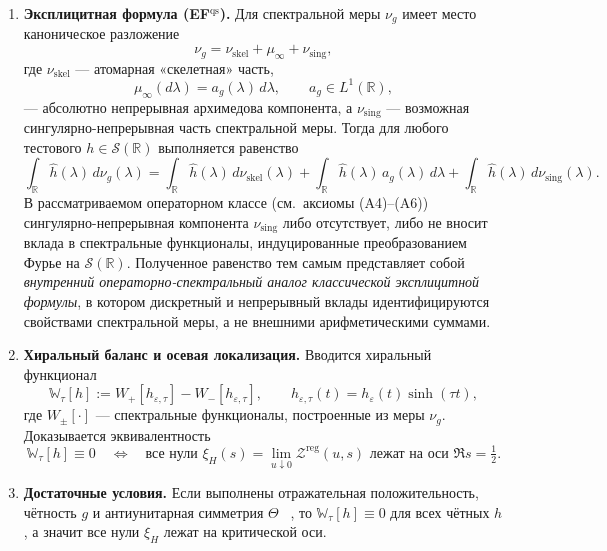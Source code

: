 \documentclass{article}
\numberwithin{equation}{section}
\theoremstyle{plain}
\theoremstyle{definition}
\theoremstyle{remark}
\def\infty{∞}\def\partial{∂}\def\sum{Σ}\def\int{∫}%
\def\cdot{·}\def\times{×}\def\pm{±}\def\mp{∓}\def\approx{≈}%
\begin{document}
\begin{enumerate}
\item[(iv)] \textbf{Эксплицитная формула (EF$^{\mathrm{qs}}$).}
Для спектральной меры $\nu_g$ имеет место каноническое разложение
\begin{equation}
\nu_g=\nu_{\mathrm{skel}}+\mu_\infty+\nu_{\mathrm{sing}},
\end{equation}
где $\nu_{\mathrm{skel}}$ — атомарная «скелетная» часть,
\begin{equation}
\mu_\infty(d\lambda)=a_g(\lambda)\,d\lambda,\qquad a_g\in L^1(\mathbb R),
\end{equation}
— абсолютно непрерывная архимедова компонента,
а $\nu_{\mathrm{sing}}$ — возможная сингулярно-непрерывная часть спектральной меры.
Тогда для любого тестового $h\in\mathcal S(\mathbb R)$ выполняется равенство
\begin{equation}
\int_{\mathbb R}\widehat h(\lambda)\,d\nu_g(\lambda)
=
\int_{\mathbb R}\widehat h(\lambda)\,d\nu_{\mathrm{skel}}(\lambda)
+
\int_{\mathbb R}\widehat h(\lambda)\,a_g(\lambda)\,d\lambda
+
\int_{\mathbb R}\widehat h(\lambda)\,d\nu_{\mathrm{sing}}(\lambda).
\end{equation}
В рассматриваемом операторном классе (см.\ аксиомы (A4)–(A6)) сингулярно-непрерывная компонента
$\nu_{\mathrm{sing}}$ либо отсутствует, либо не вносит вклада в спектральные функционалы,
индуцированные преобразованием Фурье на $\mathcal S(\mathbb R)$.
Полученное равенство тем самым представляет собой \emph{внутренний операторно-спектральный
аналог классической эксплицитной формулы}, в котором дискретный и непрерывный вклады
идентифицируются свойствами спектральной меры, а не внешними арифметическими суммами.


  \item[(v)] \textbf{Хиральный баланс и осевая локализация.}
  Вводится хиральный функционал
  \begin{equation}
  \mathbb W_\tau[h]
  :=W_+[h_{\varepsilon,\tau}]-W_-[h_{\varepsilon,\tau}],
  \qquad 
  h_{\varepsilon,\tau}(t)=h_\varepsilon(t)\sinh(\tau t),
  \end{equation}
  где $W_\pm[\cdot]$ — спектральные функционалы, построенные из меры $\nu_g$. 
  Доказывается эквивалентность
  \begin{equation}
  \mathbb W_\tau[h]\equiv 0
  \quad \Longleftrightarrow \quad
  \text{все нули }\xi_H(s)
  =\lim_{u\downarrow0}\mathcal Z^{\mathrm{reg}}(u,s)
  \text{ лежат на оси }\Re s=\tfrac12.
  \end{equation}


  \item[(vi)] \textbf{Достаточные условия.}
  Если выполнены отражательная положительность, чётность $g$ и антиунитарная симметрия $\Theta$ ~\cite{OsterwalderSchrader1973}, то $\mathbb W_\tau[h]\equiv0$ для всех чётных $h$, а значит все нули $\xi_H$ лежат на критической оси.
\end{enumerate}
\end{document}
